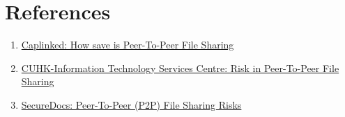 \documentclass{article}
\begin{document}
\section{References}
\begin{enumerate}
    \item \href{https://www.caplinked.com/blog/is-peer-to-peer-file-sharing-safe/}{Caplinked: How save is Peer-To-Peer File Sharing}
    \item \href{https://www.itsc.cuhk.edu.hk/it-policies/risks-in-peer-to-peer-file-sharing/}{CUHK-Information Technology Services Centre: Risk in Peer-To-Peer File Sharing}
    \item \href{https://www.securedocs.com/blog/2013/02/peer-to-peer-p2p-file-sharing-risks}{SecureDocs: Peer-To-Peer (P2P) File Sharing Risks}
\end{enumerate}
\end{document}

